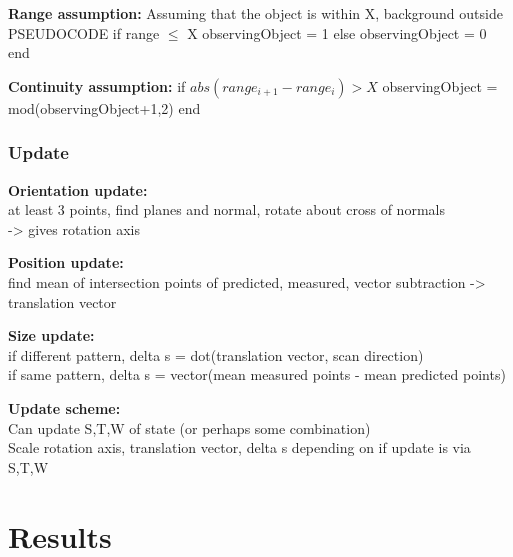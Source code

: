 		\textbf{Range assumption:}
		Assuming that the object is within X, background outside
		PSEUDOCODE
		if range $\leq$ X
			observingObject = 1
		else
			observingObject = 0
		end
		
		\textbf{Continuity assumption:}
		if $abs(range_{i+1}-range_i) > X$
			observingObject = mod(observingObject+1,2)
		end
	\subsubsection{Update}
		\textbf{Orientation update:}\\
			at least 3 points, find planes and normal, rotate about cross of normals\\
			-> gives rotation axis
			
		\textbf{Position update:}\\
			find mean of intersection points of predicted, measured, vector subtraction
			-> translation vector
			
		\textbf{Size update:}\\
			if different pattern, delta s = dot(translation vector, scan direction)\\
			if same pattern, delta s = vector(mean measured points - mean predicted points)
			
		\textbf{Update scheme:}\\
			Can update S,T,W of state (or perhaps some combination)\\
			Scale rotation axis, translation vector, delta s depending on if update is via S,T,W
			
\section{Results}